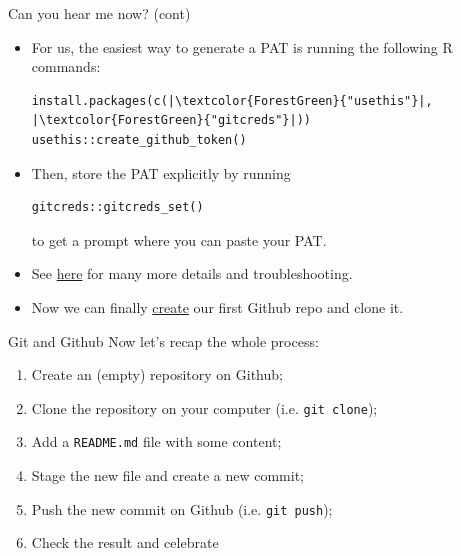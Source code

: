 \documentclass[
hyperref={bookmarks=false},
xcolor={dvipsnames,svgnames*,x11names*}, 
12pt
]{beamer}
\begin{document}
\begin{frame}[fragile]{Can you hear me now? (cont)}
\vspace{-0.5cm}
\begin{itemize}
\itemsep 2ex
\item For us, the easiest way to generate a PAT is running the following R commands: 
\begin{lstlisting}[basicstyle=\color{black}\ttfamily\scriptsize, backgroundcolor=\color{white}]
install.packages(c(|\textcolor{ForestGreen}{"usethis"}|, |\textcolor{ForestGreen}{"gitcreds"}|))
usethis::create_github_token()
\end{lstlisting}
\item Then, store the PAT explicitly by running
\begin{lstlisting}[basicstyle=\color{black}\ttfamily\scriptsize, backgroundcolor=\color{white}]
gitcreds::gitcreds_set()
\end{lstlisting} 
to get a prompt where you can paste your PAT. 
\item See \href{https://happygitwithr.com/https-pat.html}{here} for many more details and troubleshooting. 
\item Now we can finally \href{https://github.com/new}{create} our first Github repo and clone it.
\end{itemize}
\end{frame}

\begin{frame}{Git and Github}
\vspace{-0.5cm}
Now  let's recap the whole process: 
\begin{enumerate}
\itemsep 2ex
\item Create an (empty) repository on Github; 
\item Clone the repository on your computer (i.e. \texttt{git clone});
\item Add a \texttt{README.md} file with some content; 
\item Stage the new file and create a new commit; 
\item Push the new commit on Github (i.e. \texttt{git push}); 
\item Check the result and celebrate   
\end{enumerate}
\end{frame}
\end{document}
